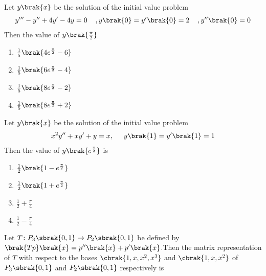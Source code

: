   \item Let $y\brak{x}$ be the solution of the initial value problem 
  \begin{align}
      y^{\prime\prime\prime} -y^{\prime\prime} + 4y^\prime -4y =0 \hspace{0.4cm} ,y\brak{0}=y^\prime \brak{0} = 2  \hspace{0.4cm},  y^{\prime\prime}\brak{0}=0
  \end{align}
  Then the value of $y\brak{\frac{\pi}{2}}$
  \begin{multicols}{4}
  \begin{enumerate}
      \item $\frac{1}{5}\brak{4e^{\frac{\pi}{2}}-6}$
            \item $\frac{1}{5}\brak{6e^{\frac{\pi}{2}}-4}$
                  \item $\frac{1}{5}\brak{8e^{\frac{\pi}{2}}-2}$
                        \item $\frac{1}{5}\brak{8e^{\frac{\pi}{2}}+2}$\\
  \end{enumerate}
  \end{multicols}
  \item Let $y\brak{x}$ be the solution of the initial value problem 
  \begin{align}
      x^2y^{\prime\prime} + x y^{\prime} + y = x , \hspace{0.5cm} y\brak{1} = y^\prime \brak{1} = 1
  \end{align}
  Then the value of $y\brak{e^{\frac{\pi}{2}}}$ is
  \begin{multicols}{4}
      \begin{enumerate}
          \item $\frac{1}{2}\brak{1 - e^{\frac{\pi}{2}}}$
           \item $\frac{1}{2}\brak{1 + e^{\frac{\pi}{2}}}$
            \item $\frac{1}{2}+\frac{\pi}{4}$
             \item $\frac{1}{2} - \frac{\pi}{4}$\\
      \end{enumerate}
  \end{multicols}
  \item Let $T \colon P_3\sbrak{0,1} \rightarrow P_2\sbrak{0,1}$ be defined by $\brak{Tp}\brak{x} = p^{\prime\prime}\brak{x} + p^{\prime}\brak{x}$.Then the matrix representation of $T$ with respect to the bases $\cbrak{1,x,x^2,x^3}$ and $\cbrak{1,x,x^2}$ of $P_3\sbrak{0,1}$ and $P_2\sbrak{0,1}$ respectively is
